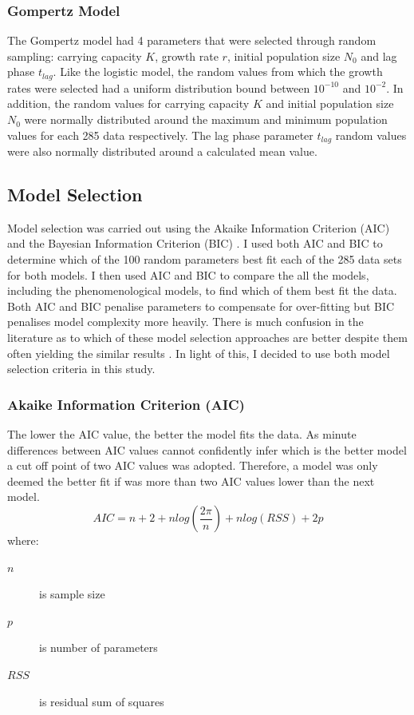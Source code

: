 \documentclass[11pt]{article}
\begin{document}
    \subsubsection{Gompertz Model}
    The Gompertz model had 4 parameters that were selected through random sampling: carrying capacity $K$, growth rate $r$, initial population size $N_0$ and lag phase $t_{lag}$. Like the logistic model, the random values from which the growth rates were selected had a uniform distribution bound between $10^{-10}$ and $10^{-2}$. In addition, the random values for carrying capacity $K$ and initial population size $N_0$ were normally distributed around the maximum and minimum population values for each 285 data respectively. The lag phase parameter $t_{lag}$ random values were also normally distributed around a calculated mean value.
    
    
    \subsection{Model Selection}
    Model selection was carried out using the Akaike Information Criterion (AIC) \citep{akaike1977entropy} and the Bayesian Information Criterion (BIC) \citep{schwarz1978estimating}. I used both AIC and BIC to determine which of the 100 random parameters best fit each of the 285 data sets for both models. I then used AIC and BIC to compare the all the models, including the phenomenological models, to find which of them best fit the data. Both AIC and BIC penalise parameters to compensate for over-fitting but BIC penalises model complexity more heavily. There is much confusion in the literature as to which of these model selection approaches are better despite them often yielding the similar results \citep{aho2014model}. In light of this, I decided to use both model selection criteria in this study.
    
    \subsubsection{Akaike Information Criterion (AIC)}
    The lower the AIC value, the better the model fits the data. As minute differences between AIC values cannot confidently infer which is the better model a cut off point of two AIC values was adopted. Therefore, a model was only deemed the better fit if was more than two AIC values lower than the next model.
    \[AIC = n + 2 + nlog(\frac{2 \pi }{n}) +nlog(RSS) + 2p\]
    where:
    \begin{description}
    \item[$n$] is sample size
    \item[$p$] is number of parameters
    \item[$RSS$] is residual sum of squares
    \end{description}
    
\end{document}
